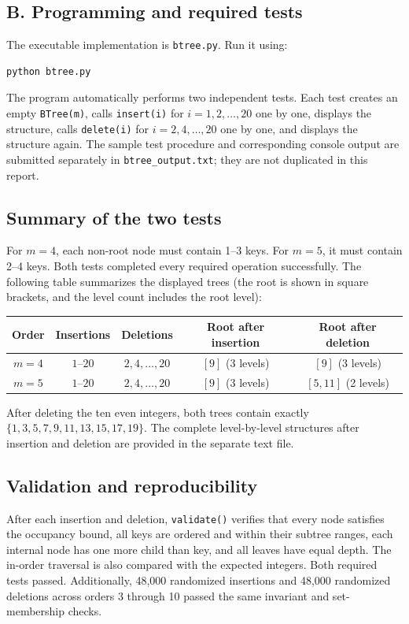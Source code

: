 \documentclass{cisXXX}
\begin{document}
\subsection*{B. Programming and required tests}
The executable implementation is \texttt{btree.py}. Run it using:
\begin{lstlisting}
python btree.py
\end{lstlisting}
The program automatically performs two independent tests. Each test creates
an empty \texttt{BTree(m)}, calls \texttt{insert(i)} for $i=1,2,\ldots,20$
one by one, displays the structure, calls \texttt{delete(i)} for
$i=2,4,\ldots,20$ one by one, and displays the structure again. The
sample test procedure and corresponding console output are submitted separately
in \texttt{btree\_output.txt}; they are not duplicated in this report.

\subsection*{Summary of the two tests}
For $m=4$, each non-root node must contain 1--3 keys. For $m=5$, it must
contain 2--4 keys. Both tests completed every required operation successfully.
The following table summarizes the displayed trees (the root is shown in
square brackets, and the level count includes the root level):
\begin{center}
\begin{tabular}{@{}ccccc@{}}
\toprule
Order & Insertions & Deletions & Root after insertion & Root after deletion\\
\midrule
$m=4$ & $1$--$20$ & $2,4,\ldots,20$ & $[9]$ (3 levels) & $[9]$ (3 levels)\\
$m=5$ & $1$--$20$ & $2,4,\ldots,20$ & $[9]$ (3 levels) & $[5,11]$ (2 levels)\\
\bottomrule
\end{tabular}
\end{center}
After deleting the ten even integers, both trees contain exactly
$\{1,3,5,7,9,11,13,15,17,19\}$. The complete level-by-level structures
after insertion and deletion are provided in the separate text file.

\subsection*{Validation and reproducibility}
After each insertion and deletion, \texttt{validate()} verifies that every
node satisfies the occupancy bound, all keys are ordered and within their
subtree ranges, each internal node has one more child than key, and all leaves
have equal depth. The in-order traversal is also compared with the expected
integers. Both required tests passed. Additionally, 48,000 randomized insertions
and 48,000 randomized deletions across orders 3 through 10 passed the same
invariant and set-membership checks.
\end{document}
